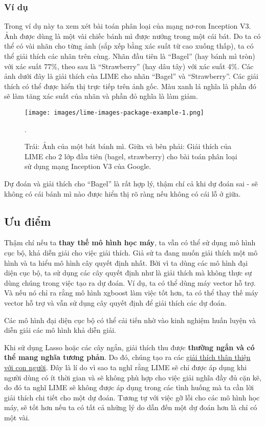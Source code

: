 \subsubsection{Ví dụ}

Trong ví dụ này ta xem xét bài toán phân loại của mạng nơ-ron Inception V3. Ảnh được dùng là một vài chiếc bánh mì được nướng trong một cái bát. Do ta có thể có vài nhãn cho từng ảnh (sắp xếp bằng xác suất từ cao xuống thấp), ta có thể giải thích các nhãn trên cùng. Nhãn đầu tiên là ``Bagel'' (hay bánh mì tròn) với xác suất 77\%, theo sau là ``Strawberry'' (hay dâu tây) với xác suất 4\%. Các ảnh dưới đây là giải thích của LIME cho nhãn ``Bagel'' và ``Strawberry''. Các giải thích có thể được hiển thị trực tiếp trên ảnh gốc. Màu xanh lá nghĩa là phần đó sẽ làm tăng xác suất của nhãn và phần đỏ nghĩa là làm giảm.

\begin{figure*}[h!]
	\centering
	\texttt{[image: images/lime-images-package-example-1.png]}
	\label{fig:5_36}
	\caption{Trái: Ảnh của một bát bánh mì. Giữa và bên phải: Giải thích của LIME cho 2 lớp đầu tiên (bagel, strawberry) cho bài toán phân loại sử dụng mạng Inception V3 của Google.}.
	
\end{figure*}

Dự đoán và giải thích cho ``Bagel'' là rất hợp lý, thậm chí cả khi dự đoán sai - sẽ không có cái bánh mì nào được hiển thị rõ ràng nếu không có cái lỗ ở giữa.

\subsection{Ưu điểm}

Thậm chí nếu ta \textbf{thay thế mô hình học máy}, ta vẫn có thể sử dụng mô hình cục bộ, khả diễn giải cho việc giải thích. Giả sử ta đang muốn giải thích một mô hình và ta hiểu mô hình cây quyết định nhất. Bởi vì ta dùng các mô hình đại diện cục bộ, ta sử dụng các cây quyết định như là giải thích mà không thực sự dùng chúng trong việc tạo ra dự đoán. Ví dụ, ta có thể dùng máy vector hỗ trợ. Và nếu nó chỉ ra rằng mô hình xgboost làm việc tốt hơn, ta có thể thay thế máy vector hỗ trợ và vẫn sử dụng cây quyết định để giải thích các dự đoán.

Các mô hình đại diện cục bộ có thể cải tiến nhờ vào kinh nghiệm huấn luyện và diễn giải các mô hình khả diễn giải.

Khi sử dụng Lasso hoặc các cây ngắn, giải thích thu được \textbf{thường ngắn và có thể mang nghĩa tương phản}. Do đó, chúng tạo ra các \href{https://christophm.github.io/interpretable-ml-book/explanation.html#explanation}{giải thích thân thiện với con người}. Đây là lí do vì sao ta nghĩ rằng LIME sẽ chỉ được áp dụng khi người dùng có ít thời gian và sẽ không phù hợp cho việc giải nghĩa đầy đủ cặn kẽ, do đó ta nghĩ LIME sẽ không được áp dụng trong các tình huống mà ta cần lời giải thích chi tiết cho một dự đoán. Tương tự với việc gỡ lỗi cho các mô hình học máy, sẽ tốt hơn nếu ta có tất cả những lý do dẫn đến một dự đoán hơn là chỉ có một vài.

